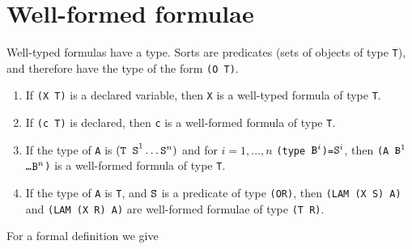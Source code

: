 \section{Well-formed formulae}

Well-typed formulas have a type. Sorts are predicates (sets of objects of type {\tt T}), and therefore have the 
type of the form {\tt (O T)}.
\begin{enumerate}
\item If {\tt (X T)} is a declared variable, then {\tt X} is a
      well-typed formula of type {\tt T}.
\item If {\tt (c T)} is declared, then {\tt c} is a
      well-formed formula of type {\tt T}.
\item If the type of {\tt A} is ${\tt (T\;\;S}^1\ldots{\tt S}^n{\tt)}$ and for $i=1,\ldots,n$
      {\tt (type ${\tt B}^i$)=${\tt S}^i$},
      then {\tt (A ${\tt B}^1$ \ldots ${\tt B}^n$)} is a well-formed
      formula of type {\tt T}.
\item If the type of {\tt A} is {\tt T}, and ${\tt S}$ is a predicate of type {\tt (OR)}, then
      {\tt (LAM (X S) A)} and {\tt (LAM (X R) A)}  are well-formed formulae of type {\tt (T R)}.
\end{enumerate}
For a formal definition we give 
